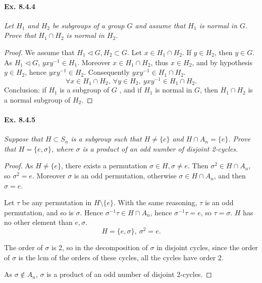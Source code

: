 \documentclass[11pt,a4paper]{article}
\begin{document}
\paragraph{Ex. 8.4.4}

{\it Let $H_1$ and $H_2$ be subgroups of a group $G$ and assume that $H_1$ is normal in $G$. Prove that $H_1\cap H_2$ is normal in $H_2$.
}

\begin{proof}
We assume that $H_1 \lhd G, H_2\subset G$.
Let $x \in H_1 \cap H_2$.
If $y \in H_2$, then $y \in G$. As $H_1 \lhd G$, $yxy^{-1} \in H_1$. Moreover  $x \in H_1 \cap H_2$, thus $x \in H_2$, and  by hypothesis $y\in H_2$, hence $yxy^{-1} \in H_2$. Consequently $yxy^{-1} \in H_1\cap H_2$.
$$\forall x \in H_1\cap H_2,\ \forall y \in H_2, \ yxy^{-1} \in H_1\cap H_2.$$
Conclusion:  if $H_1$ is a subgroup of $G$ , and if $H_1$ is normal in $G$, then  $H_1\cap H_2$ is a normal subgroup of $H_2$.
\end{proof}

\paragraph{Ex. 8.4.5}

{\it Suppose that $H \subset S_n$ is a subgroup such that $H\ne \{e\}$ and $H \cap A_n = \{e\}$. Prove that $H =\{e,\sigma\}$, where $\sigma$ is a product of an odd number of disjoint 2-cycles.
}

\begin{proof}

As   $H\neq \{e\}$, there exists a permutation $\sigma \in H,\sigma \neq e$. Then $\sigma^2 \in H\cap A_n$, so $\sigma^2=e$. Moreover $\sigma$  is an odd permutation, 
otherwise $\sigma \in H\cap  A_n$, and then $ \sigma = e$.

Let $\tau$ be any permutation in $H \setminus \{e\}$. With the same reasoning, $\tau$ is an odd permutation, and so is $\sigma$. Hence $\sigma^{-1} \tau \in H \cap A_n$, hence $\sigma^{-1} \tau = e$, so $\tau = \sigma$. $H$ has no other element than $e,\sigma$.
$$H = \{e,\sigma\},\ \sigma^2 = e.$$

The order of $\sigma$ is 2, so in the decomposition of $\sigma$ in disjoint cycles, since the order of $\sigma$ is the lcm of the orders of these cycles, all the cycles have order 2.

As $\sigma \not \in A_n$, $\sigma$ is a product of an odd number of disjoint 2-cycles.
\end{proof}
\end{document}

